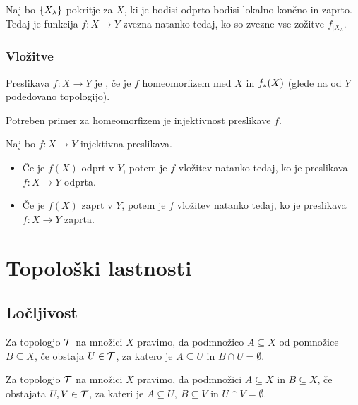 \begin{posledica}
    Naj bo $\left\{X_\lambda\right\}$ pokritje za $X$, ki je bodisi odprto bodisi lokalno končno in zaprto. Tedaj je funkcija $f: X \to Y$ zvezna natanko tedaj, ko so zvezne vse zožitve $f_{|X_\lambda}$.
\end{posledica}

\subsubsection{Vložitve}
\begin{definicija}
    Preslikava $f: X \to Y$ je , če je $f$ homeomorfizem med $X$ in $f_{*}(X)$ (glede na od $Y$ podedovano topologijo).
\end{definicija}

\begin{opomba}
    Potreben primer za homeomorfizem je injektivnost preslikave $f$. 
\end{opomba}

\begin{trditev}
    Naj bo $f: X \to Y$ injektivna preslikava.
    \begin{itemize}
        \item Če je $f(X)$ odprt v $Y$, potem je $f$ vložitev natanko tedaj, ko je preslikava $f: X \to Y$ odprta.
        \item Če je $f(X)$ zaprt v $Y$, potem je $f$ vložitev natanko tedaj, ko je preslikava $f: X \to Y$ zaprta.
    \end{itemize}
\end{trditev}

\section{Topološki lastnosti}
\subsection{Ločljivost}
\begin{definicija}
    Za topologjo $\mathcal{T}$ na množici $X$ pravimo, da  podmnožico $A \subseteq X$ od pomnožice $B \subseteq X$, če obstaja $U \in \mathcal{T}$, za katero je $A \subseteq U$ in $B \cap U = \emptyset$.
\end{definicija}

\begin{definicija}
    Za topologjo $\mathcal{T}$ na množici $X$ pravimo, da  podmnožici $A \subseteq X$ in $B \subseteq X$, če obstajata $U, V \in \mathcal{T}$, za kateri je $A \subseteq U, \ B \subseteq V$ in $U \cap V = \emptyset$.
\end{definicija}

